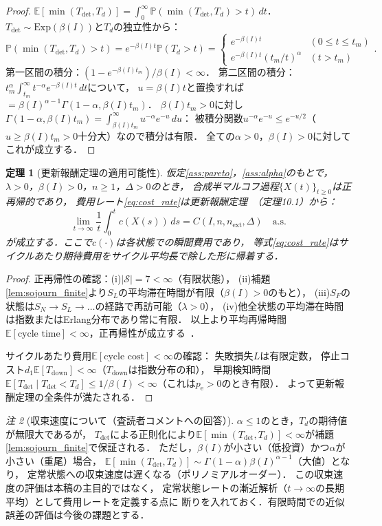 \documentclass[12pt,a4paper]{article}
\theoremstyle{plain}
\newtheorem{theorem}{定理}[section]
\theoremstyle{definition}
\theoremstyle{remark}
\newtheorem{remark}[theorem]{注}
\newcommand{\E}{\mathbb{E}}
\newcommand{\Prob}{\mathbb{P}}
\newcommand{\pe}{p_{\mathrm{e}}}
\newcommand{\Tdet}{T_{\mathrm{det}}}
\newcommand{\Tdown}{T_{\mathrm{down}}}
\newcommand{\betaI}{\beta(I)}
\begin{document}
\begin{proof}
$\E[\min(\Tdet,T_d)]=\int_0^\infty\Prob(\min(\Tdet,T_d)>t)\,dt$．
$\Tdet\sim\mathrm{Exp}(\betaI)$と$T_d$の独立性から：
\[
\Prob(\min(\Tdet,T_d)>t)=e^{-\betaI t}\Prob(T_d>t)
=\begin{cases}e^{-\betaI t}&(0\le t\le t_m)\\ e^{-\betaI t}(t_m/t)^\alpha&(t>t_m)\end{cases}.
\]
第一区間の積分：$(1-e^{-\betaI t_m})/\betaI<\infty$．
第二区間の積分：$t_m^\alpha\int_{t_m}^\infty t^{-\alpha}e^{-\betaI t}\,dt$について，
$u=\betaI t$と置換すれば$=\betaI^{\alpha-1}\Gamma(1-\alpha,\betaI t_m)$．
$\betaI t_m>0$に対し$\Gamma(1-\alpha,\betaI t_m)=\int_{\betaI t_m}^\infty u^{-\alpha}e^{-u}\,du$：
被積分関数$u^{-\alpha}e^{-u}\le e^{-u/2}$（$u\ge\betaI t_m>0$十分大）なので積分は有限．
全ての$\alpha>0$，$\betaI>0$に対してこれが成立する．
\end{proof}

\begin{theorem}[更新報酬定理の適用可能性]\label{thm:renewal}
仮定\ref{ass:pareto}，\ref{ass:alpha}のもとで，
$\lambda>0$，$\betaI>0$，$n\ge1$，$\Delta>0$のとき，
合成半マルコフ過程$\{X(t)\}_{t\ge0}$は正再帰的であり，
費用レート\eqref{eq:cost_rate}は更新報酬定理~\cite{ross2014}（定理10.1）から：
\[
\lim_{t\to\infty}\frac{1}{t}\int_0^t c(X(s))\,ds = C(I,n,n_{\mathrm{ext}},\Delta)
\quad\text{a.s.}
\]
が成立する．ここで$c(\cdot)$は各状態での瞬間費用であり，
等式\eqref{eq:cost_rate}はサイクルあたり期待費用をサイクル平均長で除した形に帰着する．
\end{theorem}

\begin{proof}
正再帰性の確認：(i)$|\mathcal{S}|=7<\infty$（有限状態），
(ii)補題\ref{lem:sojourn_finite}より$S_L$の平均滞在時間が有限（$\betaI>0$のもと），
(iii)$S_F$の状態は$S_N\to S_L\to\ldots$の経路で再訪可能（$\lambda>0$），
(iv)他全状態の平均滞在時間は指数またはErlang分布であり常に有限．
以上より平均再帰時間$\E[\text{cycle time}]<\infty$，正再帰性が成立する~\cite{limnios2001}．

サイクルあたり費用$\E[\text{cycle cost}]<\infty$の確認：
失敗損失$L$は有限定数，
停止コスト$d_1\E[\Tdown]<\infty$（$\Tdown$は指数分布の和），
早期検知時間$\E[\Tdet\mid\Tdet<T_d]\le 1/\betaI<\infty$（これは$\pe>0$のとき有限）．
よって更新報酬定理の全条件が満たされる．
\end{proof}

\begin{remark}[収束速度について（査読者コメントへの回答）]
$\alpha\le1$のとき，$T_d$の期待値が無限大であるが，
$\Tdet$による正則化により$\E[\min(\Tdet,T_d)]<\infty$が補題\ref{lem:sojourn_finite}で保証される．
ただし，$\betaI$が小さい（低投資）かつ$\alpha$が小さい（重尾）場合，
$\E[\min(\Tdet,T_d)]\sim\Gamma(1-\alpha)\betaI^{\alpha-1}$（大値）となり，
定常状態への収束速度は遅くなる（ポリノミアルオーダー）．
この収束速度の評価は本稿の主目的ではなく，
定常状態レートの漸近解析（$t\to\infty$の長期平均）として費用レートを定義する点に
断りを入れておく．有限時間での近似誤差の評価は今後の課題とする．
\end{remark}
\end{document}

